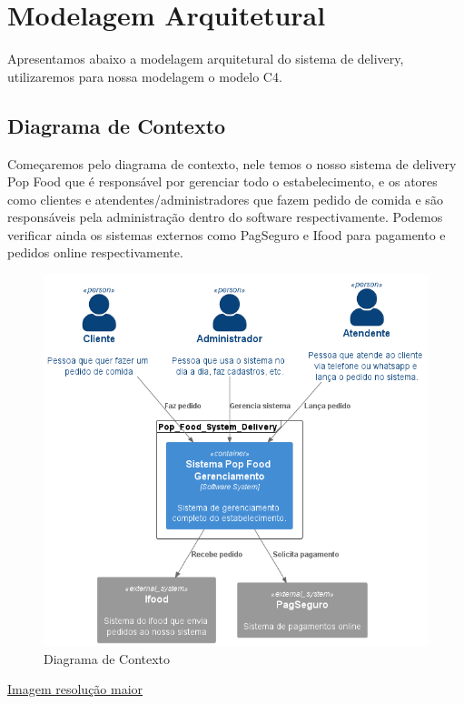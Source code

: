 \chapter{Modelagem Arquitetural}

Apresentamos abaixo a modelagem arquitetural do sistema de delivery, utilizaremos para nossa modelagem o modelo C4.

\section{Diagrama de Contexto}
Começaremos pelo diagrama de contexto, nele temos o nosso sistema de delivery Pop Food que é
responsável por gerenciar todo o estabelecimento, e os atores como clientes e atendentes/administradores que fazem pedido de comida
e são responsáveis pela administração dentro do software respectivamente. Podemos verificar ainda 
os sistemas externos como PagSeguro e Ifood para pagamento e pedidos online respectivamente.
\begin{figure}[h]
  \centering
  \includegraphics[width=1\textwidth]{diagrama_contexto.png}
  \caption{Diagrama de Contexto}
  \label{fig:Diagrama de Contexto}
\end{figure}

  \href{https://github.com/soltein/TCC/blob/main/Diagramas/out/diagrama_contexto/diagrama_contexto.png}{Imagem resolução maior}

